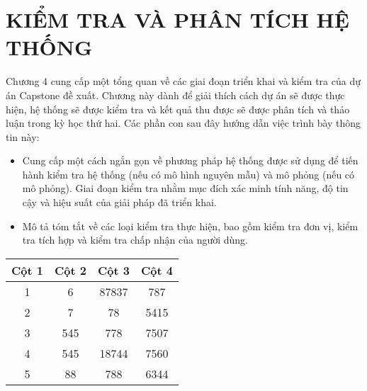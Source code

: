 \chapter{KIỂM TRA VÀ PHÂN TÍCH HỆ THỐNG}

Chương 4 cung cấp một tổng quan về các giai đoạn triển khai và kiểm tra của dự án Capstone đề xuất. Chương này dành để giải thích cách dự án sẽ được thực hiện, hệ thống sẽ được kiểm tra và kết quả thu được sẽ được phân tích và thảo luận trong kỳ học thứ hai. Các phần con sau đây hướng dẫn việc trình bày thông tin này:

\begin{itemize}
\item Cung cấp một cách ngắn gọn về phương pháp hệ thống được sử dụng để tiến hành kiểm tra hệ thống (nếu có mô hình nguyên mẫu) và mô phỏng (nếu có mô phỏng). Giai đoạn kiểm tra nhằm mục đích xác minh tính năng, độ tin cậy và hiệu suất của giải pháp đã triển khai.
\item Mô tả tóm tắt về các loại kiểm tra thực hiện, bao gồm kiểm tra đơn vị, kiểm tra tích hợp và kiểm tra chấp nhận của người dùng.
\end{itemize}

\begin{table}[!h]
\begin{center}
\begin{tabular}{||c c c c||} 
 \hline
 Cột 1 & Cột 2 & Cột 3 & Cột 4 \\ [0.5ex] 
 \hline\hline
 1 & 6 & 87837 & 787 \\ 
 \hline
 2 & 7 & 78 & 5415 \\
 \hline
 3 & 545 & 778 & 7507 \\
 \hline
 4 & 545 & 18744 & 7560 \\
 \hline
 5 & 88 & 788 & 6344 \\ [1ex] 
 \hline
\end{tabular}
\end{center}
\end{table}